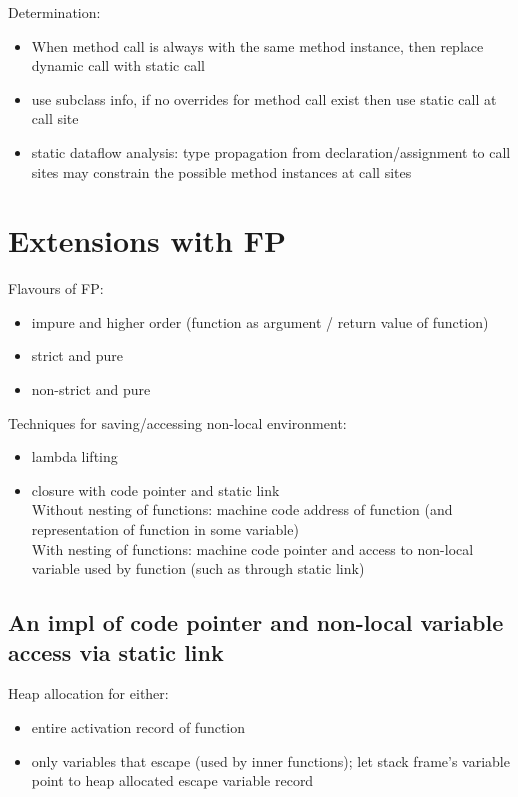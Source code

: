 \documentclass[8pt]{extarticle}
\begin{document}
\begin{multicols*}{2}
  Determination:
  \begin{itemize}
  \item When method call is always with the same method instance, then replace dynamic call with static call
  \item use subclass info, if no overrides for method call exist then use static call at call site
  \item static dataflow analysis: type propagation from declaration/assignment to call sites may constrain the possible method instances at call sites
  \end{itemize}
  
  \vfill\null
  \columnbreak

  \section{Extensions with FP}

  Flavours of FP:
  \begin{itemize}
  \item impure and higher order (function as argument / return value of function)
  \item strict and pure
  \item non-strict and pure
  \end{itemize}

  Techniques for saving/accessing non-local environment:
  \begin{itemize}
  \item lambda lifting
  \item closure with code pointer and static link\\
    Without nesting of functions: machine code address of function (and representation of function in some variable)\\
    With nesting of functions: machine code pointer and access to non-local variable used by function (such as through static link)
  \end{itemize}

  \subsection{An impl of code pointer and non-local variable access via static link}
  
  Heap allocation for either:
  \begin{itemize}
  \item entire activation record of function
  \item only variables that escape (used by inner functions); let stack frame's variable point to heap allocated escape variable record
  \end{itemize}


\end{multicols*}
\end{document}
